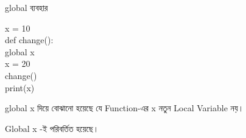 \begin{codeoutputbox}{\textenglish{\ttfamily global} ব্যবহার}

\noindent
\begin{minipage}[t]{0.52\linewidth}
\codeheading

\begin{english}
\ttfamily
x = 10\\[0.5mm]
def change():\\
\hspace*{4mm}global x\\
\hspace*{4mm}x = 20\\[0.5mm]
change()\\
print(x)
\end{english}

\end{minipage}
\hfill
\begin{minipage}[t]{0.44\linewidth}
\outputheading

\begin{center}
\textenglish{}
\end{center}

\textenglish{\ttfamily global x}
দিয়ে বোঝানো হয়েছে যে Function-এর
\textenglish{\ttfamily x}
নতুন Local Variable নয়।

Global
\textenglish{\ttfamily x}
-ই পরিবর্তিত হয়েছে।

\end{minipage}

\end{codeoutputbox}



